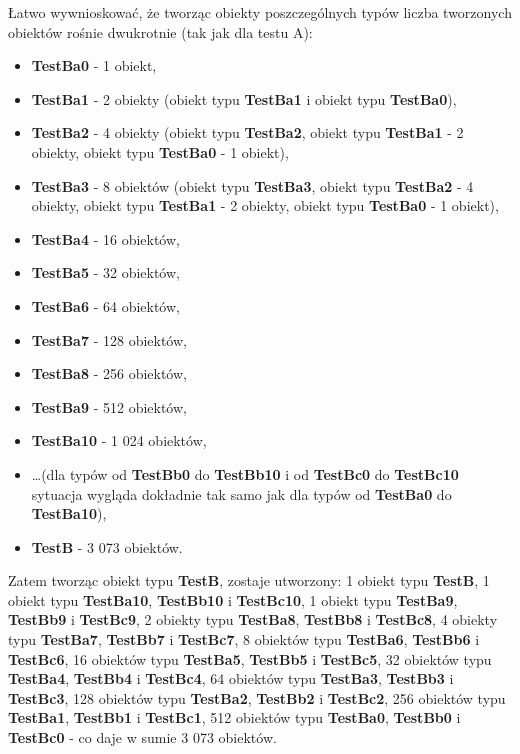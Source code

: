 \documentclass[12pt]{article}
\begin{document}
Łatwo wywnioskować, że tworząc obiekty poszczególnych typów liczba tworzonych obiektów rośnie dwukrotnie (tak jak dla testu A):
\begin{itemize}
	\item \textbf{TestBa0} - 1 obiekt,
	\item \textbf{TestBa1} - 2 obiekty (obiekt typu \textbf{TestBa1} i obiekt typu \textbf{TestBa0}),
	\item \textbf{TestBa2} - 4 obiekty (obiekt typu \textbf{TestBa2}, obiekt typu \textbf{TestBa1} - 2 obiekty, obiekt typu \textbf{TestBa0} - 1 obiekt),
	\item \textbf{TestBa3} - 8 obiektów (obiekt typu \textbf{TestBa3}, obiekt typu \textbf{TestBa2} - 4 obiekty, obiekt typu \textbf{TestBa1} - 2 obiekty, obiekt typu \textbf{TestBa0} - 1 obiekt),
	\item \textbf{TestBa4} - 16 obiektów,
	\item \textbf{TestBa5} - 32 obiektów,
	\item \textbf{TestBa6} - 64 obiektów,
	\item \textbf{TestBa7} - 128 obiektów,
	\item \textbf{TestBa8} - 256 obiektów,
	\item \textbf{TestBa9} - 512 obiektów,
	\item \textbf{TestBa10} - 1 024 obiektów,
	\item \ldots (dla typów od \textbf{TestBb0} do \textbf{TestBb10} i od \textbf{TestBc0} do \textbf{TestBc10} sytuacja wygląda dokładnie tak samo jak dla typów od \textbf{TestBa0} do \textbf{TestBa10}),
	\item \textbf{TestB} - 3 073 obiektów.
\end{itemize}
Zatem tworząc obiekt typu \textbf{TestB}, zostaje utworzony: 1 obiekt typu \textbf{TestB}, 1 obiekt typu \textbf{TestBa10}, \textbf{TestBb10} i \textbf{TestBc10}, 1 obiekt typu \textbf{TestBa9}, \textbf{TestBb9} i \textbf{TestBc9}, 2 obiekty typu \textbf{TestBa8}, \textbf{TestBb8} i \textbf{TestBc8}, 4 obiekty typu \textbf{TestBa7}, \textbf{TestBb7} i \textbf{TestBc7}, 8 obiektów typu \textbf{TestBa6}, \textbf{TestBb6} i \textbf{TestBc6}, 16 obiektów typu \textbf{TestBa5}, \textbf{TestBb5} i \textbf{TestBc5}, 32 obiektów typu \textbf{TestBa4}, \textbf{TestBb4} i \textbf{TestBc4}, 64 obiektów typu \textbf{TestBa3}, \textbf{TestBb3} i \textbf{TestBc3}, 128 obiektów typu \textbf{TestBa2}, \textbf{TestBb2} i \textbf{TestBc2}, 256 obiektów typu \textbf{TestBa1}, \textbf{TestBb1} i \textbf{TestBc1}, 512 obiektów typu \textbf{TestBa0}, \textbf{TestBb0} i \textbf{TestBc0} - co daje w sumie 3 073 obiektów.
\end{document}
